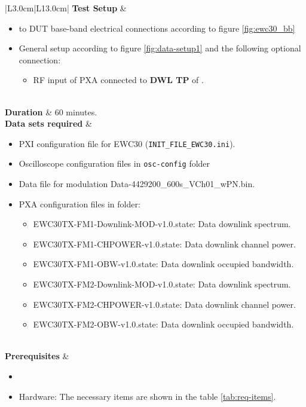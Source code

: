 \begin{table}[H]
\begin{tabular}{|L{3.0cm}|L{13.0cm}|}
	 \textbf{Test Setup} & 
	 \begin{minipage}[t]{\linewidth}
		\begin{itemize}[nosep,after=\strut]
			\item \comEgse{}{} to DUT base-band electrical connections according to figure \ref{fig:ewc30_bb}
			\item General setup according to figure \ref{fig:data-setup1} and the following optional connection:
			\begin{itemize} 
				\item RF input of PXA connected to \textbf{DWL TP} of \comEgse{}. 
			\end{itemize}
		\end{itemize}
		\end{minipage}
	 \\\hline
	 \textbf{Duration} & 60 minutes.\\\hline
	 \textbf{Data sets required} & 
	 \begin{minipage}[t]{\linewidth}
		\begin{itemize}[nosep,after=\strut]
			\item \comEgse{}{} PXI configuration file for EWC30 (\texttt{INIT\_FILE\_EWC30.ini}).
			\item Oscilloscope configuration files in \texttt{osc-config} folder
			\item Data file for modulation Data-4429200\_600s\_VCh01\_wPN.bin.
			\item PXA configuration files in \texttt{\pxaTestFolderName} folder:
				  \begin{itemize}[nosep,after=\strut]
					 \item EWC30TX-FM1-Downlink-MOD-v1.0.state: Data downlink spectrum.%
					 \item EWC30TX-FM1-CHPOWER-v1.0.state: Data downlink channel power.
					 \item EWC30TX-FM1-OBW-v1.0.state: Data downlink occupied bandwidth.
					 \item EWC30TX-FM2-Downlink-MOD-v1.0.state: Data downlink spectrum.%
					 \item EWC30TX-FM2-CHPOWER-v1.0.state: Data downlink channel power.
					 \item EWC30TX-FM2-OBW-v1.0.state: Data downlink occupied bandwidth.
				  \end{itemize}
		\end{itemize}
	\end{minipage}\\\hline
	\textbf{Prerequisites} & 
	\begin{minipage}[t]{\linewidth}
		\begin{itemize}[nosep,after=\strut]
			\item \preReqPro
			\item Hardware: The necessary items are shown in the table \ref{tab:req-items}.
		\end{itemize} 
	\end{minipage}\\\hline
\end{tabular}
	\caption{Procedure \subprocid{} \ description. } \label{tb:dataccdf}
	\end{table}

